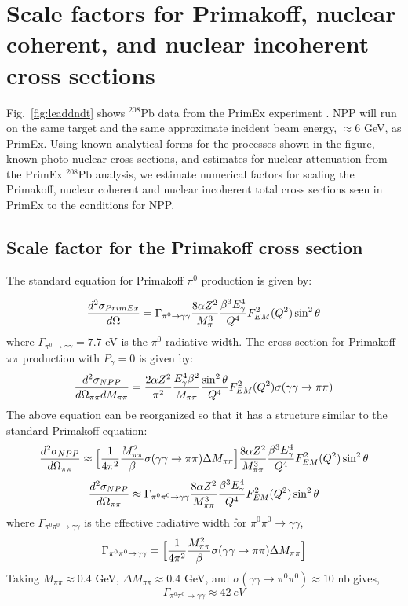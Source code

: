 \section{Scale factors for Primakoff, nuclear coherent, and nuclear incoherent cross sections  \label{sec:SigmaScaling}}
Fig.~\ref{fig:leaddndt} shows $^{208}$Pb data from the PrimEx experiment \cite{Larin:2010kq}.   NPP will run on the same target and the same approximate incident beam energy, $\approx 6$ GeV, as PrimEx.   Using known analytical forms for the processes shown in the figure, known photo-nuclear cross sections, and estimates for nuclear attenuation from the PrimEx $^{208}$Pb analysis, we estimate numerical factors for scaling the Primakoff, nuclear coherent and nuclear incoherent total cross sections seen in PrimEx to the conditions for NPP. 
    

 \subsection{Scale factor for the Primakoff cross section}
The standard equation for Primakoff $\pi^0$ production is given by: 

$$ { d^2 \sigma_{PrimEx} \over d \Omega } = \Gamma_{\pi^0 \rightarrow \gamma \gamma} { 8 \alpha Z^2 \over M^3_{\pi} }
{ \beta^3 E_\gamma^4 \over Q^4 } F^2_{EM}(Q^2) \sin^2 \theta   $$ 
where $\Gamma_{\pi^0 \rightarrow \gamma \gamma} = 7.7$ eV is the $\pi^0$ radiative width.  The cross section for Primakoff $\pi \pi$ production with $P_{\gamma}=0$ is given by: 
$$ {d^2 \sigma_{NPP} \over d \Omega_{\pi \pi} dM_{\pi \pi} } = {2 \alpha Z^2 \over \pi^2} 
{E_\gamma^4 \beta^2 \over M_{\pi \pi} } {\sin^2 \theta \over Q^4 } F^2_{EM}(Q^2) 
 \sigma( \gamma \gamma \rightarrow \pi \pi) $$
The above equation can be reorganized so that it has a structure similar to the standard Primakoff equation: 
$$ {d^2 \sigma_{NPP} \over d \Omega_{\pi \pi} } \approx
\Big[ {1 \over 4 \pi^2 }  {M^2_{\pi \pi} \over \beta }  \sigma( \gamma \gamma \rightarrow \pi \pi) \Delta M_{\pi \pi} \Big]  { 8 \alpha Z^2 \over M^3_{\pi \pi} }
{ \beta^3 E_\gamma^4 \over Q^4 } F^2_{EM}(Q^2) \sin^2 \theta  $$
$$ {d^2 \sigma_{NPP} \over d \Omega_{\pi \pi} } \approx
\Gamma_{\pi^0 \pi^0 \rightarrow \gamma \gamma}  { 8 \alpha Z^2 \over M^3_{\pi \pi} }
{ \beta^3 E_\gamma^4 \over Q^4 } F^2_{EM}(Q^2) \sin^2 \theta  $$
where  $\Gamma_{\pi^0 \pi^0 \rightarrow \gamma \gamma}$ is the effective radiative width for $\pi^0 \pi^0 \rightarrow \gamma \gamma$, 
$$ \Gamma_{\pi^0 \pi^0 \rightarrow \gamma \gamma} =\Big[ {1 \over 4 \pi^2 }  {M^2_{\pi \pi} \over \beta }  \sigma( \gamma \gamma \rightarrow \pi \pi) \Delta M_{\pi \pi} \Big] $$
Taking $M_{\pi \pi} \approx 0.4$ GeV, $\Delta M_{\pi \pi}\approx 0.4$ GeV, and $\sigma ( \gamma \gamma \rightarrow \pi^0 \pi^0) \approx 10$ nb gives, 
$$\Gamma_{\pi^0 \pi^0 \rightarrow \gamma \gamma} \approx 42\ eV$$

